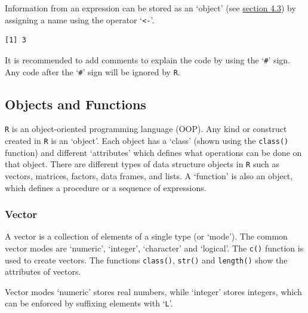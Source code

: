 Information from an expression can be stored as an `object' (see
\protect\hyperlink{ObjFun}{section 4.3}) by assigning a name using the
operator `\texttt{\textless{}-}'.

\begin{Shaded}
\begin{Highlighting}[]
\StringTok{ } \OperatorTok{+}\StringTok{ }
\end{Highlighting}
\end{Shaded}

\begin{verbatim}
[1] 3
\end{verbatim}

It is recommended to add comments to explain the code by using the
`\texttt{\#}' sign. Any code after the `\texttt{\#}' sign will be
ignored by \texttt{R}.

\hypertarget{ObjFun}{%
\subsection{Objects and Functions}\label{ObjFun}}

\texttt{R} is an object-oriented programming language (OOP). Any kind or
construct created in \texttt{R} is an `object'. Each object has a
`class' (shown using the \texttt{class()} function) and different
`attributes' which defines what operations can be done on that object.
There are different types of data structure objects in \texttt{R} such
as vectors, matrices, factors, data frames, and lists. A `function' is
also an object, which defines a procedure or a sequence of expressions.

\hypertarget{vector}{%
\subsubsection{Vector}\label{vector}}

A vector is a collection of elements of a single type (or `mode'). The
common vector modes are `numeric', `integer', `character' and `logical'.
The \texttt{c()} function is used to create vectors. The functions
\texttt{class()}, \texttt{str()} and \texttt{length()} show the
attributes of vectors.

Vector modes `numeric' stores real numbers, while `integer' stores
integers, which can be enforced by suffixing elements with `\texttt{L}'.

\begin{Shaded}
\begin{Highlighting}[]
\StringTok{ }\NormalTok{(}\NormalTok{, }\NormalTok{, }\NormalTok{)}
\end{Highlighting}
\end{Shaded}

